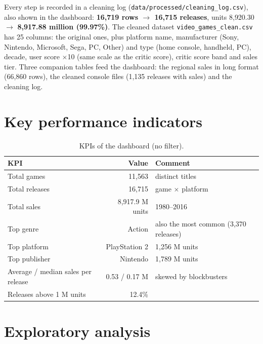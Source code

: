\documentclass[12pt,a4paper]{article}
\begin{document}
Every step is recorded in a cleaning log (\texttt{data/processed/cleaning\_log.csv}),
also shown in the dashboard: \textbf{16{,}719 rows $\to$ 16{,}715 releases}, units
8{,}920.30 $\to$ \textbf{8{,}917.88 million (99.97\%)}. The cleaned dataset
\texttt{video\_games\_clean.csv} has 25 columns: the original ones, plus platform name,
manufacturer (Sony, Nintendo, Microsoft, Sega, PC, Other) and type (home console,
handheld, PC), decade, user score $\times$10 (same scale as the critic score), critic
score band and sales tier. Three companion tables feed the dashboard: the regional sales
in long format (66{,}860 rows), the cleaned console files (1{,}135 releases with sales)
and the cleaning log.

\section{Key performance indicators}

\begin{table}[H]\centering\small
\caption{KPIs of the dashboard (no filter).}
\begin{tabularx}{\linewidth}{@{}lrX@{}}
\toprule
KPI & Value & Comment\\\midrule
Total games & 11{,}563 & distinct titles\\
Total releases & 16{,}715 & game $\times$ platform\\
Total sales & 8{,}917.9 M units & 1980--2016\\
Top genre & Action & also the most common (3{,}370 releases)\\
Top platform & PlayStation 2 & 1{,}256 M units\\
Top publisher & Nintendo & 1{,}789 M units\\
Average / median sales per release & 0.53 / 0.17 M & skewed by blockbusters\\
Releases above 1 M units & 12.4\% & \\
\bottomrule
\end{tabularx}
\end{table}

\section{Exploratory analysis}
\end{document}

